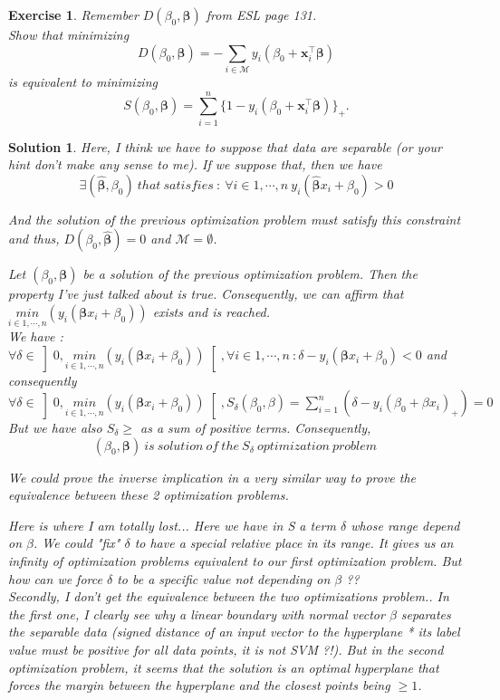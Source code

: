 \documentclass[12pt,a4paper]{article}
\newtheorem{exercise}{Exercise}
\newtheorem{solution}{Solution}
\begin{document}
\begin{exercise}
Remember $D(\beta_0,\boldsymbol \beta)$ from ESL page 131.\\
Show that minimizing 
$$D(\beta_0,\boldsymbol \beta)=-\sum\limits_{i\in\mathcal M}
y_i(\beta_0 + \mathbf x_i^\top \boldsymbol \beta )$$ 
is equivalent to minimizing 
$$S(\beta_0,\boldsymbol \beta)=\sum
_{i=1}^n \{1-y_i(\beta_0+\mathbf x_i^\top\boldsymbol \beta)\}_+.$$
\end{exercise}
\begin{solution}
Here, I think we have to suppose that data are separable (or your hint don't make any sense to me). If we suppose that, then we have $$\exists  (\hat{\boldsymbol \beta}, \beta_0) \ that\ satisfies \ :\ \forall i \in 1, \cdots, n\  y_i(\hat{\boldsymbol \beta} x_i + \beta_0) > 0 $$ 

And the solution of the previous optimization problem must satisfy this constraint and thus, $D(\beta_0,\hat{\boldsymbol \beta}) = 0$ and $\mathcal M = \emptyset$.

Let $(\beta_0,\boldsymbol \beta)$ be a solution of the previous optimization problem. Then the property I've just talked about is true. Consequently, we can affirm that $ \underset{i \in 1, \cdots, n}{min} (y_i(\boldsymbol \beta x_i + \beta_0))$ exists and is reached.\\

We have : $\forall \delta \in \left] 0, \underset{i \in 1, \cdots, n}{min} (y_i(\boldsymbol \beta x_i + \beta_0)) \right[, \forall i \in 1,\cdots,n \ : \delta - y_i(\boldsymbol \beta x_i + \beta_0) < 0 $ and consequently $\forall \delta \in \left] 0, \underset{i \in 1, \cdots, n}{min} (y_i(\boldsymbol \beta x_i + \beta_0)) \right[, S_\delta(\beta_0, \beta) = \sum_{i=1}^{n} (\delta - y_i(\beta_0 + \beta x_i)_+) = 0$\\

But we have also $S_\delta \geq$ as a sum of positive terms. Consequently, $$(\beta_0, \boldsymbol \beta)\ is\ solution\ of\ the\ S_\delta \ optimization\ problem\ $$

We could prove the inverse implication in a very similar way to prove the equivalence between these 2 optimization problems.

Here is where I am totally lost... Here we have in S a term $\delta$ whose range depend on $\beta$. We could "fix" $\delta$ to have a special relative place in its range. It gives us an infinity of optimization problems equivalent to our first optimization problem. But how can we force $\delta$ to be a specific value not depending on $\beta$ ?? \\

Secondly, I don't get the equivalence between the two optimizations problem.. In the first one, I clearly see why a linear boundary with normal vector $\beta$ separates the separable data (signed distance of an input vector to the hyperplane * its label value must be positive for all data points, it is not SVM ?!). But in the second optimization problem, it seems that the solution is an optimal hyperplane that forces the margin between the hyperplane and the closest points being $\geq 1$.  
\end{solution}
\end{document}
